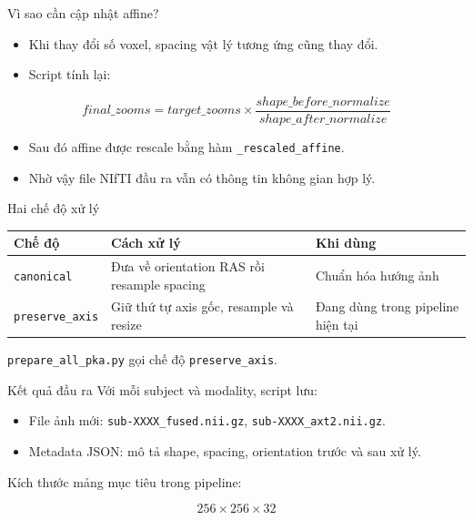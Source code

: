 \documentclass[aspectratio=169]{beamer}
\begin{document}
\begin{frame}{Vì sao cần cập nhật affine?}
  \begin{itemize}
    \item Khi thay đổi số voxel, spacing vật lý tương ứng cũng thay đổi.
    \item Script tính lại:
  \end{itemize}

  \[
    final\_zooms = target\_zooms \times
    \frac{shape\_before\_normalize}{shape\_after\_normalize}
  \]

  \begin{itemize}
    \item Sau đó affine được rescale bằng hàm \texttt{\_rescaled\_affine}.
    \item Nhờ vậy file NIfTI đầu ra vẫn có thông tin không gian hợp lý.
  \end{itemize}
\end{frame}

\begin{frame}{Hai chế độ xử lý}
  \begin{table}
    \centering
    \begin{tabular}{lll}
      \toprule
      Chế độ & Cách xử lý & Khi dùng \\
      \midrule
      \texttt{canonical} & Đưa về orientation RAS rồi resample spacing & Chuẩn hóa hướng ảnh \\
      \texttt{preserve\_axis} & Giữ thứ tự axis gốc, resample và resize & Đang dùng trong pipeline hiện tại \\
      \bottomrule
    \end{tabular}
  \end{table}

  \vspace{0.3cm}
  \texttt{prepare\_all\_pka.py} gọi chế độ \texttt{preserve\_axis}.
\end{frame}

\begin{frame}{Kết quả đầu ra}
  Với mỗi subject và modality, script lưu:

  \begin{itemize}
    \item File ảnh mới: \texttt{sub-XXXX\_fused.nii.gz}, \texttt{sub-XXXX\_axt2.nii.gz}.
    \item Metadata JSON: mô tả shape, spacing, orientation trước và sau xử lý.
  \end{itemize}

  \vspace{0.3cm}
  Kích thước mảng mục tiêu trong pipeline:

  \[
    256 \times 256 \times 32
  \]
\end{frame}
\end{document}
